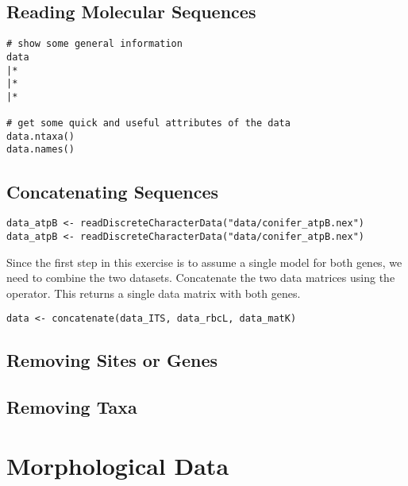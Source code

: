 \subsection{Reading Molecular Sequences}


{\tt \begin{snugshade*}
\begin{lstlisting}
# show some general information
data
|*
|*
|*

# get some quick and useful attributes of the data
data.ntaxa()
data.names()	
\end{lstlisting}
\end{snugshade*}}



\subsection{Concatenating Sequences}


{\tt \begin{snugshade*}
\begin{lstlisting}
data_atpB <- readDiscreteCharacterData("data/conifer_atpB.nex")
data_atpB <- readDiscreteCharacterData("data/conifer_atpB.nex")
\end{lstlisting}
\end{snugshade*}}

Since the first step in this exercise is to assume a single model for both genes, we need to combine the two datasets.
Concatenate the two data matrices using the \cl{+} operator. This returns a single data matrix with both genes.

{\tt \begin{snugshade*}
\begin{lstlisting}
data <- concatenate(data_ITS, data_rbcL, data_matK)
\end{lstlisting}
\end{snugshade*}}



\subsection{Removing Sites or Genes}


\subsection{Removing Taxa}



\section{Morphological Data}



